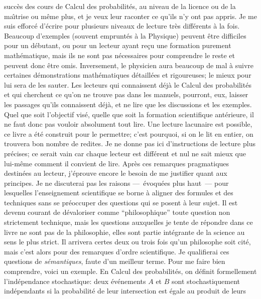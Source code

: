 succ\`es des cours de Calcul des probabilit\'es, au  niveau de la licence 
ou de la ma\^\i trise ou m\^eme plus, et je veux leur raconter ce qu'ils n'y 
ont pas appris.    \medskip 
Je me suis efforc\'e d'\'ecrire pour plusieurs niveaux de  lecture tr\`es  
diff\'erents \`a la fois. Beaucoup d'exemples (souvent emprunt\'es \`a la 
Physique) peuvent \^etre  difficiles pour un d\'ebutant, ou pour un lecteur 
ayant  re\c cu une formation purement math\'ematique, mais ils ne sont 
pas  n\'ecessaires pour  comprendre le reste et peuvent donc \^etre omis. 
Inversement, le physicien aura  beaucoup de mal \`a suivre certaines 
d\'emonstrations math\'ematiques  d\'etaill\'ees et rigoureuses; le  
mieux pour lui sera de les sauter.  Les lecteurs qui connaissent d\'ej\`a  
le Calcul des probabilit\'es et qui cherchent ce  qu'on ne trouve pas dans 
les manuels, pourront, eux, laisser les passages qu'ils connaissent 
d\'ej\`a, et ne lire que les  discussions et les exemples.   
\medskip 
Quel que soit l'objectif vis\'e, quelle que soit  la formation scientifique 
ant\'erieure, il ne faut donc pas vouloir absolument tout lire. Une lecture 
lacunaire est possible, ce livre a \'et\'e construit pour le permettre;  
c'est pourquoi, si on le lit en entier, on trouvera bon nombre de redites.  
\medskip 
Je ne donne pas ici d'instructions de lecture plus pr\'ecises; ce serait  
vain car chaque lecteur est diff\'erent et nul ne  sait mieux que 
lui-m\^eme comment il convient de lire.  
\bigskip 
Apr\`es ces remarques pragmatiques destin\'ees au lecteur, j'\'eprouve 
encore le besoin de me justifier quant aux principes. 
\medskip 
Je ne discuterai pas les raisons ---~\'evoqu\'ees plus haut~--- pour 
lesquelles l'enseignement  scientifique se borne \`a aligner des formules 
et des techniques sans se pr\'eoccuper des questions qui se posent \`a 
leur sujet. Il est devenu courant de d\'evaloriser  comme ``philosophique'' 
toute question non strictement technique, mais les questions  auxquelles 
je tente de r\'epondre dans ce livre ne sont pas de la philosophie, elles 
sont partie int\'egrante de la science au sens le plus strict. Il arrivera 
certes deux ou trois fois qu'un philosophe soit cit\'e, mais  c'est alors 
pour des remarques d'ordre scientifique. Je quali\-fierai ces questions  
de {\it s\'emantiques}, faute d'un meilleur terme.  
\medskip 
Pour me faire bien comprendre, voici un exemple.  En Calcul des 
probabilit\'es, on d\'efinit formellement l'ind\'ependance stochastique: 
deux \'ev\'enements $A$ et $B$ sont stochastiquement ind\'ependants si 
la probabilit\'e de leur intersection  est \'egale au produit de leurs 
